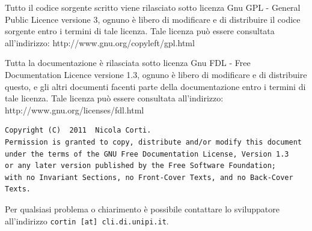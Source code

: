 \documentclass[a4paper,10pt]{article}
\begin{document}
Tutto il codice sorgente scritto viene rilasciato sotto licenza Gnu GPL - General Public Licence versione 3, ognuno \`e libero di modificare e di distribuire il codice sorgente entro i termini di tale licenza.
Tale licenza pu\`o essere consultata all'indirizzo: http://www.gnu.org/copyleft/gpl.html

Tutta la documentazione \`e rilasciata sotto licenza Gnu FDL - Free Documentation Licence versione 1.3, ognuno \`e libero di modificare e di distribuire questo, e gli altri documenti facenti parte della documentazione entro i termini di tale licenza.
Tale licenza pu\`o essere consultata all'indirizzo: http://www.gnu.org/licenses/fdl.html

\begin{verbatim}
Copyright (C)  2011  Nicola Corti.
Permission is granted to copy, distribute and/or modify this document
under the terms of the GNU Free Documentation License, Version 1.3
or any later version published by the Free Software Foundation;
with no Invariant Sections, no Front-Cover Texts, and no Back-Cover Texts.
\end{verbatim}
Per qualsiasi problema o chiarimento \`e possibile contattare lo sviluppatore all'indirizzo \texttt{cortin [at] cli.di.unipi.it}.
\end{document}
